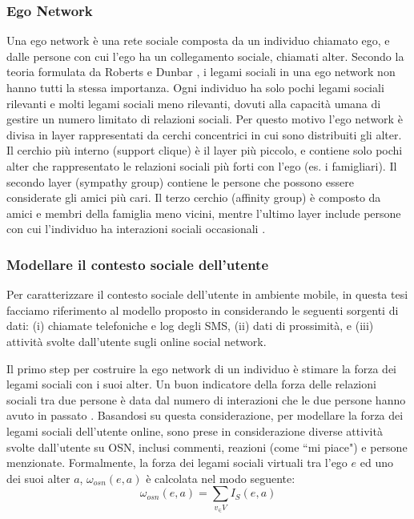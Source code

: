 \documentclass[12pt,italian]{report}
\begin{document}
\subsubsection{Ego Network}
Una ego network è una rete sociale composta da un individuo chiamato ego, e dalle persone con cui l'ego ha un collegamento sociale, chiamati alter. Secondo la teoria formulata da Roberts e Dunbar \cite{roberts-dunbar}, i legami sociali in una ego network non hanno tutti la stessa importanza. Ogni individuo ha solo pochi legami sociali rilevanti e molti legami sociali meno rilevanti, dovuti alla capacità umana di gestire un numero limitato di relazioni sociali. Per questo motivo l'ego network è divisa in layer rappresentati da cerchi concentrici in cui sono distribuiti gli alter. Il cerchio più interno (support clique) è il layer più piccolo, e contiene solo pochi alter che rappresentato le relazioni sociali più forti con l'ego (es. i famigliari). Il secondo layer (sympathy group) contiene le persone che possono essere considerate gli amici più cari. Il terzo cerchio (affinity group) è composto da amici e membri della famiglia meno vicini, mentre l'ultimo layer include persone con cui l'individuo ha interazioni sociali occasionali \cite{ego-net}.

\subsubsection{Modellare il contesto sociale dell'utente}
Per caratterizzare il contesto sociale dell'utente in ambiente mobile, in questa tesi facciamo riferimento al modello proposto in \cite{ego-net} considerando le seguenti sorgenti di dati: (i) chiamate telefoniche e log degli SMS, (ii) dati di prossimità, e (iii) attività svolte dall'utente sugli online social network.

Il primo step per costruire la ego network di un individuo è stimare la forza dei legami sociali con i suoi alter. Un buon indicatore della forza delle relazioni sociali tra due persone è data dal numero di interazioni che le due persone hanno avuto in passato \cite{OSN-strength}. Basandosi su questa considerazione, per modellare la forza dei legami sociali dell'utente online, sono prese in considerazione diverse attività svolte dall'utente su OSN, inclusi commenti, reazioni (come ``mi piace") e persone menzionate. Formalmente, la forza dei legami sociali virtuali tra l'ego $e$ ed uno dei suoi alter $a$, $\omega_{osn}(e,a)$ è calcolata nel modo seguente:
\begin{equation}	
	\omega_{osn}(e,a)=\sum_{v_\in V}I_S (e, a)
\end{equation}
\end{document}
